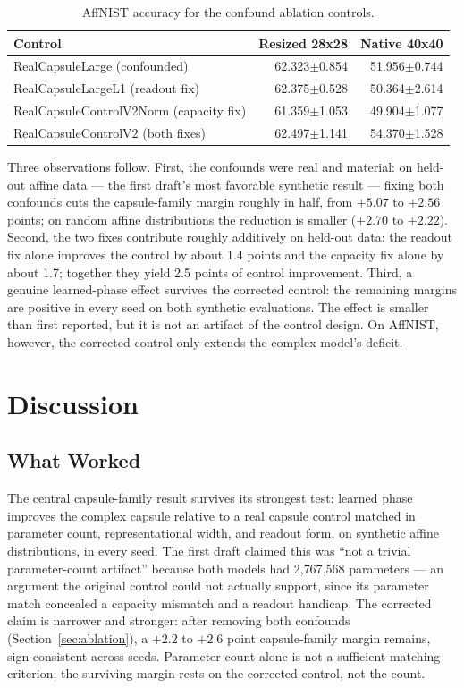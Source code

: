 \documentclass[11pt]{article}
\begin{document}
\begin{table}[t]
\centering
\small
\begin{tabular}{lrr}
\toprule
Control & Resized 28x28 & Native 40x40 \\
\midrule
RealCapsuleLarge (confounded) & 62.323$\pm$0.854 & 51.956$\pm$0.744 \\
RealCapsuleLargeL1 (readout fix) & 62.375$\pm$0.528 & 50.364$\pm$2.614 \\
RealCapsuleControlV2Norm (capacity fix) & 61.359$\pm$1.053 & 49.904$\pm$1.077 \\
RealCapsuleControlV2 (both fixes) & 62.497$\pm$1.141 & 54.370$\pm$1.528 \\
\bottomrule
\end{tabular}
\caption{AffNIST accuracy for the confound ablation controls.}
\label{tab:ablation-affnist}
\end{table}

Three observations follow. First, the confounds were real and material: on held-out affine data --- the first draft's most favorable synthetic result --- fixing both confounds cuts the capsule-family margin roughly in half, from $+5.07$ to $+2.56$ points; on random affine distributions the reduction is smaller ($+2.70$ to $+2.22$). Second, the two fixes contribute roughly additively on held-out data: the readout fix alone improves the control by about 1.4 points and the capacity fix alone by about 1.7; together they yield 2.5 points of control improvement. Third, a genuine learned-phase effect survives the corrected control: the remaining margins are positive in every seed on both synthetic evaluations. The effect is smaller than first reported, but it is not an artifact of the control design. On AffNIST, however, the corrected control only extends the complex model's deficit.

\section{Discussion}

\subsection{What Worked}
The central capsule-family result survives its strongest test: learned phase improves the complex capsule relative to a real capsule control matched in parameter count, representational width, and readout form, on synthetic affine distributions, in every seed. The first draft claimed this was ``not a trivial parameter-count artifact'' because both models had 2{,}767{,}568 parameters --- an argument the original control could not actually support, since its parameter match concealed a capacity mismatch and a readout handicap. The corrected claim is narrower and stronger: after removing both confounds (Section~\ref{sec:ablation}), a $+2.2$ to $+2.6$ point capsule-family margin remains, sign-consistent across seeds. Parameter count alone is not a sufficient matching criterion; the surviving margin rests on the corrected control, not the count.
\end{document}
